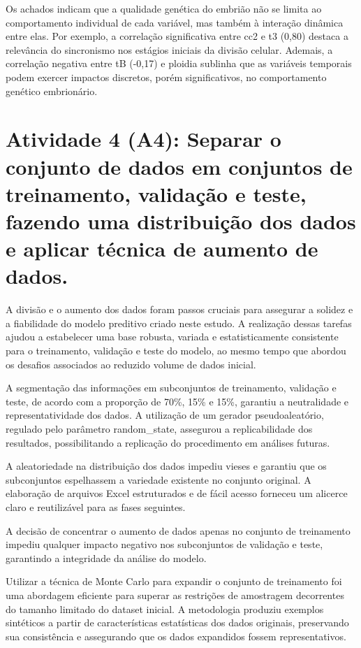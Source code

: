 Os achados indicam que a qualidade genética do embrião não se limita ao comportamento individual de cada variável, mas também à interação dinâmica entre elas. Por exemplo, a correlação significativa entre cc2 e t3 (0,80) destaca a relevância do sincronismo nos estágios iniciais da divisão celular. Ademais, a correlação negativa entre tB (-0,17) e ploidia sublinha que as variáveis temporais podem exercer impactos discretos, porém significativos, no comportamento genético embrionário.

\section{Atividade 4 (A4): Separar o conjunto de dados em conjuntos de treinamento, validação e teste, fazendo uma distribuição dos dados e aplicar técnica de aumento de dados.}

A divisão e o aumento dos dados foram passos cruciais para assegurar a solidez e a fiabilidade do modelo preditivo criado neste estudo. A realização dessas tarefas ajudou a estabelecer uma base robusta, variada e estatisticamente consistente para o treinamento, validação e teste do modelo, ao mesmo tempo que abordou os desafios associados ao reduzido volume de dados inicial.

A segmentação das informações em subconjuntos de treinamento, validação e teste, de acordo com a proporção de 70\%, 15\% e 15\%, garantiu a neutralidade e representatividade dos dados. A utilização de um gerador pseudoaleatório, regulado pelo parâmetro random\_state, assegurou a replicabilidade dos resultados, possibilitando a replicação do procedimento em análises futuras.

A aleatoriedade na distribuição dos dados impediu vieses e garantiu que os subconjuntos espelhassem a variedade existente no conjunto original. A elaboração de arquivos Excel estruturados e de fácil acesso forneceu um alicerce claro e reutilizável para as fases seguintes.

A decisão de concentrar o aumento de dados apenas no conjunto de treinamento impediu qualquer impacto negativo nos subconjuntos de validação e teste, garantindo a integridade da análise do modelo.

Utilizar a técnica de Monte Carlo para expandir o conjunto de treinamento foi uma abordagem eficiente para superar as restrições de amostragem decorrentes do tamanho limitado do dataset inicial. A metodologia produziu exemplos sintéticos a partir de características estatísticas dos dados originais, preservando sua consistência e assegurando que os dados expandidos fossem representativos.

